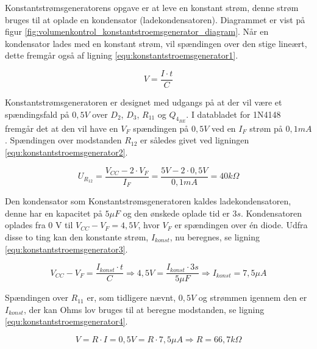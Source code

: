 Konstantstrømsgeneratorens opgave er at leve en konstant strøm, denne strøm bruges til at oplade en kondensator (ladekondensatoren). Diagrammet er vist på figur \ref{fig:volumenkontrol_konstantstroemsgenerator_diagram}. Når en kondensator lades med en konstant strøm, vil spændingen over den stige lineært, dette fremgår også af ligning \ref{equ:konstantstroemsgenerator1}.

\begin{equation}
\label{equ:konstantstroemsgenerator1}
V = \frac{I \cdot t}{C}
\end{equation}

Konstantstrømsgeneratoren er designet med udgangs på at der vil være et spændingsfald på $0,5 V$ over $D_2$, $D_3$, $R_{11}$ og $Q_{4_{BE}}$. I databladet for 1N4148 fremgår det at den vil have en $V_F$ spændingen på $0,5 V$ ved en $I_F$ strøm på $0,1 mA$. Spændingen over modstanden $R_{12}$ er således givet ved ligningen \ref{equ:konstantstroemsgenerator2}.

\begin{equation}
\label{equ:konstantstroemsgenerator2}
U_{R_{12}} = \frac{V_{CC} - 2 \cdot V_F}{I_F} = \frac{5V - 2 \cdot 0,5 V}{0,1 mA} = 40 k\Omega
\end{equation}

Den kondensator som Konstantstrømsgeneratoren kaldes ladekondensatoren, denne har en kapacitet på $5 \mu F$ og den ønskede oplade tid er $3 s$. Kondensatoren oplades fra 0 V til $V_{CC} - V_F = 4,5 V$, hvor $V_F$ er spændingen over én diode. Udfra disse to ting kan den konstante strøm, $I_{konst}$, nu beregnes, se ligning \ref{equ:konstantstroemsgenerator3}.

\begin{equation}
\label{equ:konstantstroemsgenerator3}
V_{CC} - V_F = \frac{I_{konst} \cdot t}{C} \Rightarrow 4,5 V = \frac{I_{konst} \cdot 3 s}{5 \mu F} \Rightarrow I_{konst} = 7,5 \mu A
\end{equation}

Spændingen over $R_{11}$ er, som tidligere nævnt, $0,5 V$ og strømmen igennem den er $I_{konst}$, der kan Ohms lov bruges til at beregne modstanden, se ligning \ref{equ:konstantstroemsgenerator4}.

\begin{equation}
\label{equ:konstantstroemsgenerator4}
V = R \cdot I = 0,5 V = R \cdot 7,5 \mu A \Rightarrow R = 66,7 k\Omega
\end{equation}

